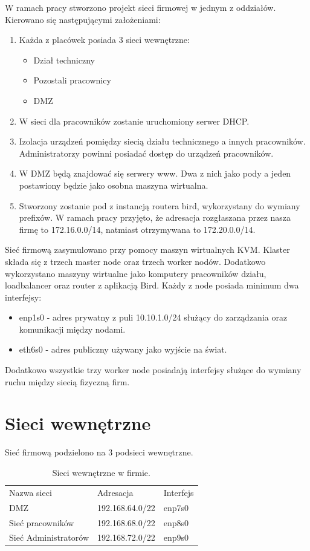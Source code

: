 \documentclass[pl,final,oneside]{mgr} %
\begin{document}
W ramach pracy stworzono projekt sieci firmowej w jednym z oddziałów. Kierowano się następującymi założeniami:
\begin{enumerate}

	\item Każda z placówek posiada 3 sieci wewnętrzne:
	\begin{itemize}
		\item Dział techniczny
		\item Pozostali pracownicy
		\item DMZ
	\end{itemize}

	\item W sieci dla pracowników zostanie uruchomiony serwer DHCP.
	\item Izolacja urządzeń pomiędzy siecią działu technicznego a innych pracowników. Administratorzy powinni posiadać dostęp do urządzeń pracowników.
	\item W DMZ będą znajdować się serwery www. Dwa z nich jako pody a jeden postawiony będzie jako osobna maszyna wirtualna.
	\item Stworzony zostanie pod z instancją routera bird, wykorzystany do wymiany prefixów. W ramach pracy przyjęto, że adresacja rozgłaszana przez nasza firmę to 172.16.0.0/14, natmiast otrzymywana to 172.20.0.0/14. 
\end{enumerate}
Sieć firmową zasymulowano przy pomocy maszyn wirtualnych KVM. Klaster składa się z trzech master node oraz trzech worker nodów. Dodatkowo wykorzystano maszyny wirtualne jako komputery pracowników działu, loadbalancer oraz router z aplikacją Bird. Każdy z node posiada minimum dwa interfejsy:
\begin{itemize}
	\item enp1s0 - adres prywatny z puli 10.10.1.0/24 służący do zarządzania oraz komunikacji między nodami.
	\item eth6s0 - adres publiczny używany jako wyjście na świat.
\end{itemize}
Dodatkowo wszystkie trzy worker node posiadają interfejsy służące do wymiany ruchu między siecią fizyczną firm.


\section{Sieci wewnętrzne}
Sieć firmową podzielono na 3 podsieci wewnętrzne.
\begin{table}[h!]
	\begin{tabular}{lll}
		Nazwa sieci          & Adresacja       & Interfejs \\
		DMZ                  & 192.168.64.0/22 & enp7s0    \\
		Sieć pracowników     & 192.168.68.0/22 & enp8s0    \\
		Sieć Administratorów & 192.168.72.0/22 & enp9s0   
	\end{tabular}
	\label{tab:adresacje}
	\caption{Sieci wewnętrzne w firmie.}
\end{table}
\end{document}
